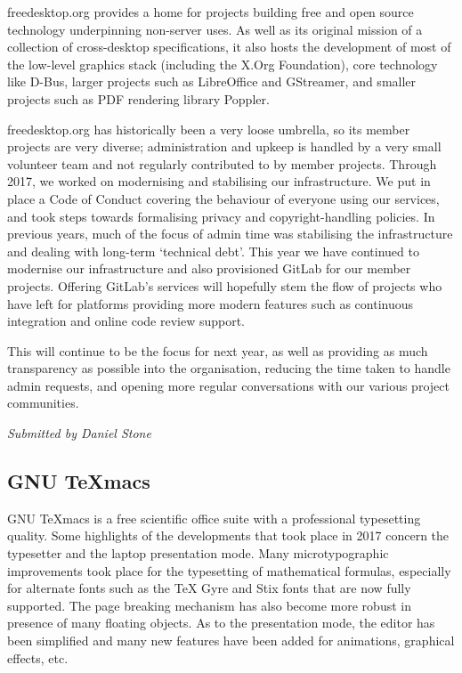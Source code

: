 \documentclass[a4paper]{report}
\begin{document}
freedesktop.org provides a home for projects building free and
open source technology underpinning non-server uses. As well as its
original mission of a collection of cross-desktop specifications, it
also hosts the development of most of the low-level graphics stack
(including the X.Org Foundation), core technology like D-Bus, larger
projects such as LibreOffice and GStreamer, and smaller projects such as
PDF rendering library Poppler.

freedesktop.org has historically been a very loose umbrella, so its
member projects are very diverse; administration and upkeep is handled
by a very small volunteer team and not regularly contributed to by
member projects. Through 2017, we worked on modernising and stabilising
our infrastructure. We put in place a Code of Conduct covering the
behaviour of everyone using our services, and took steps towards
formalising privacy and copyright-handling policies. In previous years,
much of the focus of admin time was stabilising the infrastructure and
dealing with long-term `technical debt'. This year we have continued to
modernise our infrastructure and also provisioned GitLab for our member
projects. Offering GitLab's services will hopefully stem the flow of
projects who have left for platforms providing more modern features such
as continuous integration and online code review support.

This will continue to be the focus for next year, as well as providing
as much transparency as possible into the organisation, reducing the
time taken to handle admin requests, and opening more regular
conversations with our various project communities.

{\em Submitted by Daniel Stone}

\subsection{GNU TeXmacs}

GNU TeXmacs is a free scientific office suite with a professional
typesetting quality.  Some highlights of the developments that took
place in 2017 concern the typesetter and the laptop presentation mode.
Many microtypographic improvements took place for the typesetting of
mathematical formulas, especially for alternate fonts such as the TeX
Gyre and Stix fonts that are now fully supported.  The page breaking
mechanism has also become more robust in presence of many floating
objects.  As to the presentation mode, the editor has been simplified
and many new features have been added for animations, graphical effects,
etc.
\end{document}
